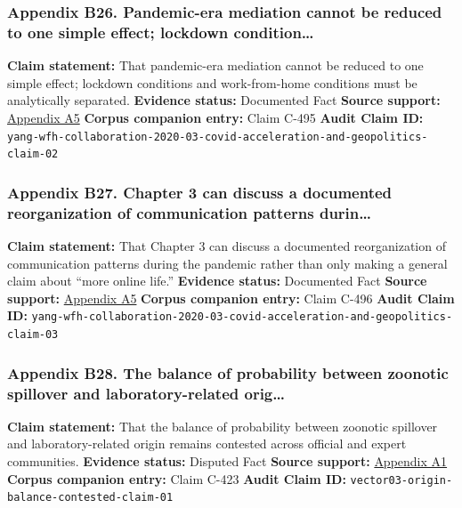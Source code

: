 \documentclass[
  american,
  11pt,
  letterpaper,
]{article}
\begin{document}
\subsubsection{Appendix B26. Pandemic-era mediation cannot be reduced to
one simple effect; lockdown
condition\ldots{}}\label{ch-03-appendix-b26-pandemic-era-mediation-cannot-be-reduced-to-one-simple-effect-lockdown-condition}

\textbf{Claim statement:} That pandemic-era mediation cannot be reduced
to one simple effect; lockdown conditions and work-from-home conditions
must be analytically separated. \textbf{Evidence status:} Documented
Fact \textbf{Source support:}
\hyperref[ch-03-appendix-a5-how-work-from-home-affects-collaboration-a-large-scale-study-of-information-workers-in-a-natural-experiment-during-covid-19]{Appendix
A5} \textbf{Corpus companion entry:} Claim C-495 \textbf{Audit Claim
ID:}
\texttt{yang-wfh-collaboration-2020-03-covid-acceleration-and-geopolitics-claim-02}

\subsubsection{Appendix B27. Chapter 3 can discuss a documented
reorganization of communication patterns
durin\ldots{}}\label{ch-03-appendix-b27-chapter-3-can-discuss-a-documented-reorganization-of-communication-patterns-durin}

\textbf{Claim statement:} That Chapter 3 can discuss a documented
reorganization of communication patterns during the pandemic rather than
only making a general claim about ``more online life.'' \textbf{Evidence
status:} Documented Fact \textbf{Source support:}
\hyperref[ch-03-appendix-a5-how-work-from-home-affects-collaboration-a-large-scale-study-of-information-workers-in-a-natural-experiment-during-covid-19]{Appendix
A5} \textbf{Corpus companion entry:} Claim C-496 \textbf{Audit Claim
ID:}
\texttt{yang-wfh-collaboration-2020-03-covid-acceleration-and-geopolitics-claim-03}

\subsubsection{Appendix B28. The balance of probability between zoonotic
spillover and laboratory-related
orig\ldots{}}\label{ch-03-appendix-b28-the-balance-of-probability-between-zoonotic-spillover-and-laboratory-related-orig}

\textbf{Claim statement:} That the balance of probability between
zoonotic spillover and laboratory-related origin remains contested
across official and expert communities. \textbf{Evidence status:}
Disputed Fact \textbf{Source support:}
\hyperref[ch-03-appendix-a1-report-on-potential-links-between-the-wuhan-institute-of-virology-and-the-origins-of-covid-19]{Appendix
A1} \textbf{Corpus companion entry:} Claim C-423 \textbf{Audit Claim
ID:} \texttt{vector03-origin-balance-contested-claim-01}
\end{document}
